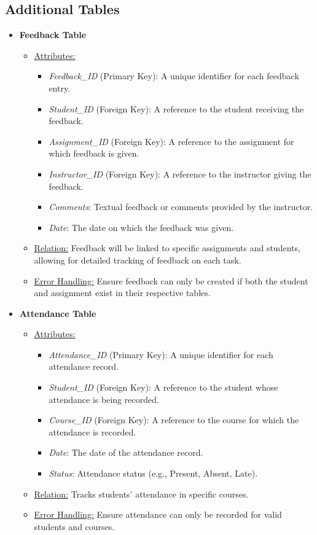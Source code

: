 \documentclass[12pt]{article}
\begin{document}
\subsection*{Additional Tables}

\begin{itemize}
    \item \textbf{Feedback Table}
    \begin{itemize}
        \item \underline{Attributes:}
        \begin{itemize}
            \item \textit{Feedback\_ID} (Primary Key): A unique identifier for each feedback entry.
            \item \textit{Student\_ID} (Foreign Key): A reference to the student receiving the feedback.
            \item \textit{Assignment\_ID} (Foreign Key): A reference to the assignment for which feedback is given.
            \item \textit{Instructor\_ID} (Foreign Key): A reference to the instructor giving the feedback.
            \item \textit{Comments}: Textual feedback or comments provided by the instructor.
            \item \textit{Date}: The date on which the feedback was given.
        \end{itemize}
        \item \underline{Relation:} Feedback will be linked to specific assignments and students, allowing for detailed tracking of feedback on each task.
        \item \underline{Error Handling:} Ensure feedback can only be created if both the student and assignment exist in their respective tables.
    \end{itemize}

    \item \textbf{Attendance Table}
    \begin{itemize}
        \item \underline{Attributes:}
        \begin{itemize}
            \item \textit{Attendance\_ID} (Primary Key): A unique identifier for each attendance record.
            \item \textit{Student\_ID} (Foreign Key): A reference to the student whose attendance is being recorded.
            \item \textit{Course\_ID} (Foreign Key): A reference to the course for which the attendance is recorded.
            \item \textit{Date}: The date of the attendance record.
            \item \textit{Status}: Attendance status (e.g., Present, Absent, Late).
        \end{itemize}
        \item \underline{Relation:} Tracks students' attendance in specific courses.
        \item \underline{Error Handling:} Ensure attendance can only be recorded for valid students and courses.
    \end{itemize}


\end{itemize}
\end{document}
